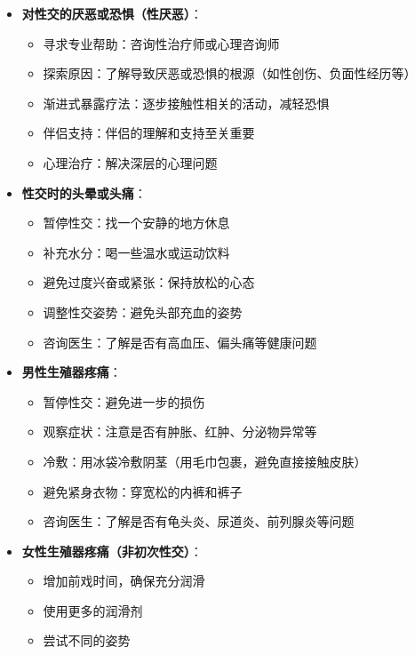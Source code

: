 \documentclass[12pt,UTF8]{ctexbook}
\begin{document}
\begin{itemize}
\begin{itemize}
		\item 进行凯格尔运动：增强盆底肌肉力量，减少阴吹的发生
		\item 调整插入和抽送的节奏：避免过度快速抽送
		\item 咨询医生：了解是否有阴道松弛或其他问题
		\item 手术治疗：在严重情况下，可考虑阴道紧缩术
	\end{itemize}
	\item \textbf{对性交的厌恶或恐惧（性厌恶）}：
	\begin{itemize}
		\item 寻求专业帮助：咨询性治疗师或心理咨询师
		\item 探索原因：了解导致厌恶或恐惧的根源（如性创伤、负面性经历等）
		\item 渐进式暴露疗法：逐步接触性相关的活动，减轻恐惧
		\item 伴侣支持：伴侣的理解和支持至关重要
		\item 心理治疗：解决深层的心理问题
	\end{itemize}
	\item \textbf{性交时的头晕或头痛}：
	\begin{itemize}
		\item 暂停性交：找一个安静的地方休息
		\item 补充水分：喝一些温水或运动饮料
		\item 避免过度兴奋或紧张：保持放松的心态
		\item 调整性交姿势：避免头部充血的姿势
		\item 咨询医生：了解是否有高血压、偏头痛等健康问题
	\end{itemize}
	\item \textbf{男性生殖器疼痛}：
	\begin{itemize}
		\item 暂停性交：避免进一步的损伤
		\item 观察症状：注意是否有肿胀、红肿、分泌物异常等
		\item 冷敷：用冰袋冷敷阴茎（用毛巾包裹，避免直接接触皮肤）
		\item 避免紧身衣物：穿宽松的内裤和裤子
		\item 咨询医生：了解是否有龟头炎、尿道炎、前列腺炎等问题
	\end{itemize}
	\item \textbf{女性生殖器疼痛（非初次性交）}：
	\begin{itemize}
		\item 增加前戏时间，确保充分润滑
		\item 使用更多的润滑剂
		\item 尝试不同的姿势

\end{itemize}
\end{itemize}
\end{document}
